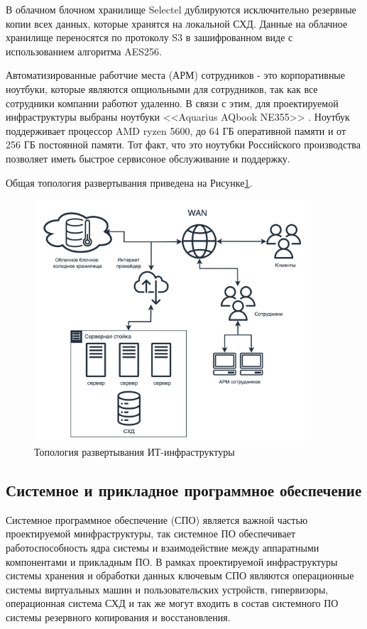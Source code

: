 \documentclass[14pt, a4paper]{extarticle}
\begin{document}
В облачном блочном хранилище Selectel дублируются исключительно резервные копии
всех данных, которые хранятся на локальной СХД. Данные на облачное хранилище переносятся
по протоколу S3 в зашифрованном виде с использованием алгоритма AES256.

Автоматизированные работчие места (АРМ) сотрудников - это корпоративные ноутбуки, которые
являются опциольными для сотрудников, так как все сотрудники компании работют удаленно.
В связи с этим, для проектируемой инфраструктуры выбраны ноутбуки <<Aquarius AQbook NE355>> \cite{aquarius-aqbook-NE355}.
Ноутбук поддерживает процессор AMD ryzen 5600, до 64 ГБ оперативной памяти и от 256 ГБ
постоянной памяти. Тот факт, что это ноутубки Российского производства позволяет
иметь быстрое сервисоное обслуживание и поддержку.

Общая топология развертывания приведена на Рисунке\;\ref{fig:infra2}.

\begin{figure}[H]
  \centering
  \includegraphics[width=0.9\textwidth]{infra2_2.png}
  \caption{Топология развертывания ИТ-инфраструктуры}
  \label{fig:infra2}
\end{figure}

\subsection{Системное и прикладное программное обеспечение}

Системное программное обеспечение (СПО) является важной частью проектируемой минфраструктуры,
так системное ПО обеспечивает работоспособность ядра системы и взаимодействие между
аппаратными компонентами и прикладным ПО. В рамках проектируемой инфраструктуры
системы хранения и обработки данных ключевым СПО являются операционные системы
виртуальных машин и пользовательских устройств, гипервизоры, операционная система СХД
и так же могут входить в состав системного ПО системы резервного копирования и восстановления.
\end{document}
